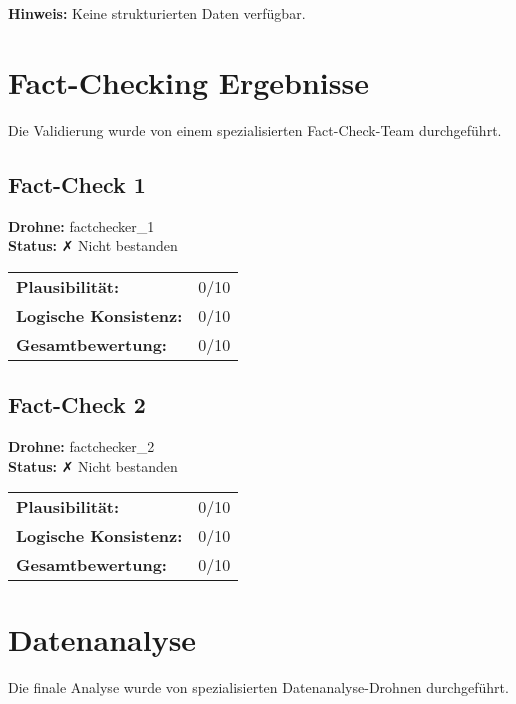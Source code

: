 \documentclass[12pt,a4paper]{article}
\begin{document}
\textbf{Hinweis:} Keine strukturierten Daten verfügbar.


\newpage
\section{Fact-Checking Ergebnisse}

Die Validierung wurde von einem spezialisierten Fact-Check-Team durchgeführt.


\subsection{Fact-Check 1}

\textbf{Drohne:} factchecker\_1\\
\textbf{Status:} ✗ Nicht bestanden\\

\begin{tabular}{ll}
\textbf{Plausibilität:} & 0/10 \\
\textbf{Logische Konsistenz:} & 0/10 \\
\textbf{Gesamtbewertung:} & 0/10 \\
\end{tabular}


\subsection{Fact-Check 2}

\textbf{Drohne:} factchecker\_2\\
\textbf{Status:} ✗ Nicht bestanden\\

\begin{tabular}{ll}
\textbf{Plausibilität:} & 0/10 \\
\textbf{Logische Konsistenz:} & 0/10 \\
\textbf{Gesamtbewertung:} & 0/10 \\
\end{tabular}



\newpage
\section{Datenanalyse}

Die finale Analyse wurde von spezialisierten Datenanalyse-Drohnen durchgeführt.
\end{document}

